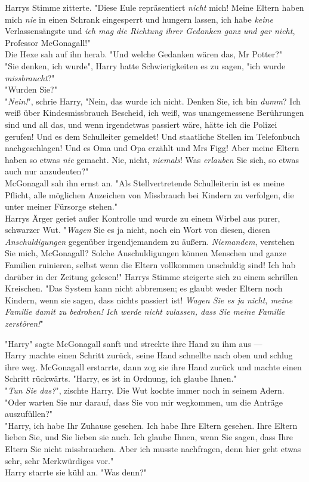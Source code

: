 {Harrys Stimme zitterte. "Diese Eule repräsentiert \emph{nicht} mich! Meine Eltern haben mich \emph{nie} in einen Schrank eingesperrt und hungern lassen, ich habe \emph{keine} Verlassensängste und \emph{ich mag die Richtung ihrer Gedanken ganz und gar nicht}, Professor McGonagall!"\\ Die Hexe sah auf ihn herab. "Und welche Gedanken wären das, Mr Potter?"\\ "Sie denken, ich wurde", Harry hatte Schwierigkeiten es zu sagen, "ich wurde \emph{missbraucht}?"\\ "Wurden Sie?"\\ "\emph{Nein!}", schrie Harry, "Nein, das wurde ich nicht. Denken Sie, ich bin \emph{dumm}? Ich weiß über Kindesmissbrauch Bescheid, ich weiß, was unangemessene Berührungen sind und all das, und wenn irgendetwas passiert wäre, hätte ich die Polizei gerufen! Und es dem Schulleiter gemeldet! Und staatliche Stellen im Telefonbuch nachgeschlagen! Und es Oma und Opa erzählt und Mrs Figg! Aber meine Eltern haben so etwas \emph{nie} gemacht. Nie, nicht, \emph{niemals}! Was \emph{erlauben} Sie sich, so etwas auch nur anzudeuten?"\\ McGonagall sah ihn ernst an. "Als Stellvertretende Schulleiterin ist es meine Pflicht, alle möglichen Anzeichen von Missbrauch bei Kindern zu verfolgen, die unter meiner Fürsorge stehen."\\ Harrys Ärger geriet außer Kontrolle und wurde zu einem Wirbel aus purer, schwarzer Wut. "\emph{Wagen} Sie es ja nicht, noch ein Wort von diesen, diesen \emph{Anschuldigungen} gegenüber irgendjemandem zu äußern. \emph{Niemandem}, verstehen Sie mich, McGonagall? Solche Anschuldigungen können Menschen und ganze Familien ruinieren, selbst wenn die Eltern vollkommen unschuldig sind! Ich hab darüber in der Zeitung gelesen!" Harrys Stimme steigerte sich zu einem schrillen Kreischen. "Das System kann nicht abbremsen; es glaubt weder Eltern noch Kindern, wenn sie sagen, dass nichts passiert ist! \emph{Wagen Sie es ja nicht, meine Familie damit zu bedrohen! Ich werde nicht zulassen, dass Sie meine Familie zerstören!}"

"Harry" sagte McGonagall sanft und streckte ihre Hand zu ihm aus ---\\ Harry machte einen Schritt zurück, seine Hand schnellte nach oben und schlug ihre weg. McGonagall erstarrte, dann zog sie ihre Hand zurück und machte einen Schritt rückwärts. "Harry, es ist in Ordnung, ich glaube Ihnen."\\ "\emph{Tun Sie das?}", zischte Harry. Die Wut kochte immer noch in seinem Adern. "Oder warten Sie nur darauf, dass Sie von mir wegkommen, um die Anträge auszufüllen?"\\ "Harry, ich habe Ihr Zuhause gesehen. Ich habe Ihre Eltern gesehen. Ihre Eltern lieben Sie, und Sie lieben sie auch. Ich glaube Ihnen, wenn Sie sagen, dass Ihre Eltern Sie nicht missbrauchen. Aber ich musste nachfragen, denn hier geht etwas sehr, sehr Merkwürdiges vor."\\ Harry starrte sie kühl an. "Was denn?"

}
